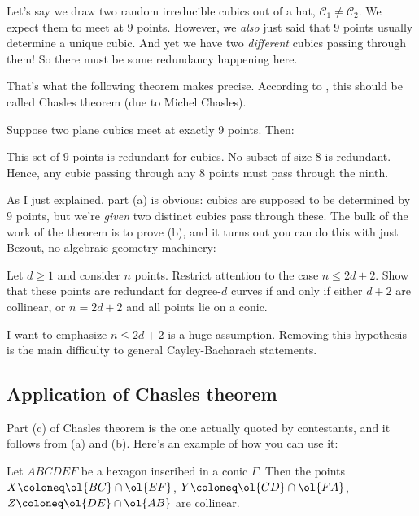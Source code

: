 \documentclass[11pt]{scrartcl}
\begin{document}
Let's say we draw two random irreducible cubics out of a hat, $\mathcal{C}_1 \neq \mathcal{C}_2$.
We expect them to meet at $9$ points.
However, we \emph{also} just said that $9$ points usually determine a unique cubic.
And yet we have two \emph{different} cubics passing through them!
So there must be some redundancy happening here.

That's what the following theorem makes precise.
According to \cite{EGH}, this should be called Chasles theorem (due to Michel Chasles).
\begin{theorem}
  [Chasles]
  Suppose two plane cubics meet at exactly $9$ points. Then:
  \begin{enumerate}[(a)]
    \itemsep1pt
    \ii This set of $9$ points is redundant for cubics.
    \ii No subset of size $8$ is redundant.
    \ii Hence, any cubic passing through any $8$ points must pass through the ninth.
  \end{enumerate}
\end{theorem}

As I just explained, part (a) is obvious:
cubics are supposed to be determined by $9$ points,
but we're \emph{given} two distinct cubics pass through these.
The bulk of the work of the theorem is to prove (b),
and it turns out you can do this with just Bezout, no algebraic geometry machinery:
\begin{problem}
  \label{prob:elem}
  Let $d \ge 1$ and consider $n$ points.
  Restrict attention
  to the case $n \le 2d+2$.
  Show that these points are redundant for degree-$d$ curves if and only if
  either $d+2$ are collinear, or $n = 2d+2$ and all points lie on a conic.
\end{problem}
I want to emphasize $n \le 2d+2$ is a huge assumption.
Removing this hypothesis is the main difficulty
to general Cayley-Bacharach statements.

\subsection{Application of Chasles theorem}
Part (c) of Chasles theorem is the one actually quoted by contestants,
and it follows from (a) and (b).
Here's an example of how you can use it:
\begin{example}
  Let $ABCDEF$ be a hexagon inscribed in a conic $\Gamma$.
  Then the points $X \coloneq \ol{BC} \cap \ol{EF}$,
  $Y \coloneq \ol{CD} \cap \ol{FA}$, $Z \coloneq \ol{DE} \cap \ol{AB}$ are collinear.
\end{example}
\end{document}
